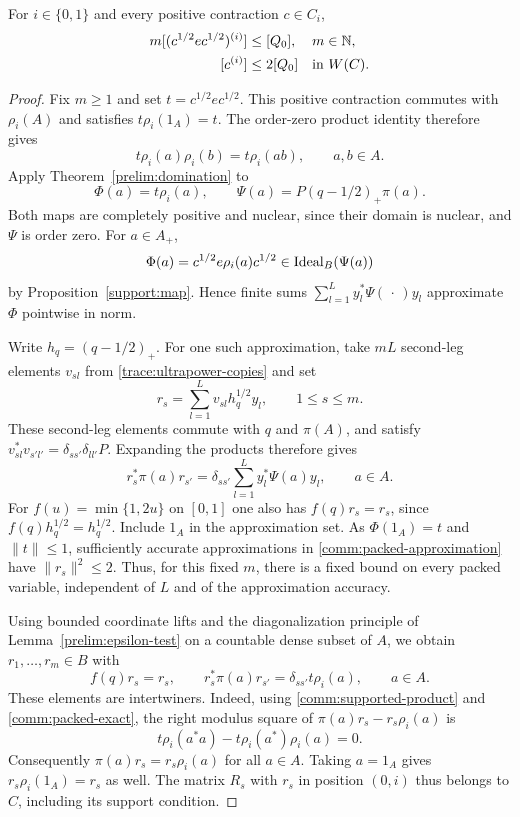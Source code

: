 \begin{proposition}\label{comm:packing}
For $i\in\{0,1\}$ and every positive contraction $c\in C_i$,
\begin{align}
 m[(c^{1/2}ec^{1/2})^{(i)}]&\leq[Q_0],
       &&m\in\mathbb N,\label{comm:small-part}\\
 [c^{(i)}]&\leq2[Q_0]
       &&\text{in }W(C).\label{comm:two-common}
\end{align}
\end{proposition}

\begin{proof}
Fix $m\geq1$ and set $t=c^{1/2}ec^{1/2}$.  This positive
contraction commutes with $\rho_i(A)$ and satisfies
$t\rho_i(1_A)=t$.  The order-zero product identity therefore gives
\begin{equation}\label{comm:supported-product}
 t\rho_i(a)\rho_i(b)=t\rho_i(ab),\qquad a,b\in A.
\end{equation}
Apply Theorem~\ref{prelim:domination} to
\[
 \Phi(a)=t\rho_i(a),\qquad
 \Psi(a)=P(q-1/2)_+\pi(a).
\]
Both maps are completely positive and nuclear, since their domain
is nuclear, and $\Psi$ is order zero.  For $a\in A_+$,
\[
 \Phi(a)=c^{1/2}e\rho_i(a)c^{1/2}
       \in\operatorname{Ideal}_B(\Psi(a))
\]
by Proposition~\ref{support:map}.  Hence finite sums
$\sum_{l=1}^L y_l^*\Psi(\,\cdot\,)y_l$ approximate $\Phi$
pointwise in norm.

Write $h_q=(q-1/2)_+$.  For one such approximation, take $mL$
second-leg elements $v_{sl}$ from \eqref{trace:ultrapower-copies} and set
\[
 r_s=\sum_{l=1}^L v_{sl}h_q^{1/2}y_l,
 \qquad 1\leq s\leq m.
\]
These second-leg elements commute with $q$ and $\pi(A)$, and satisfy
$v_{sl}^*v_{s'l'}=\delta_{ss'}\delta_{ll'}P$.  Expanding the products
therefore gives
\begin{equation}\label{comm:packed-approximation}
 r_s^*\pi(a)r_{s'}=
 \delta_{ss'}\sum_{l=1}^L y_l^*\Psi(a)y_l,
 \qquad a\in A.
\end{equation}
For $f(u)=\min\{1,2u\}$ on $[0,1]$ one also has
$f(q)r_s=r_s$, since $f(q)h_q^{1/2}=h_q^{1/2}$.
Include $1_A$ in the approximation set.  As
$\Phi(1_A)=t$ and $\|t\|\leq1$, sufficiently accurate
approximations in \eqref{comm:packed-approximation} have
$\|r_s\|^2\leq2$.  Thus, for this fixed $m$, there is a fixed
bound on every packed variable, independent of $L$ and of the
approximation accuracy.

Using bounded coordinate lifts and the diagonalization principle of
Lemma~\ref{prelim:epsilon-test} on a countable dense subset of $A$, we
obtain $r_1,\ldots,r_m\in B$ with
\begin{equation}\label{comm:packed-exact}
 f(q)r_s=r_s,\qquad
 r_s^*\pi(a)r_{s'}=\delta_{ss'}t\rho_i(a),
 \qquad a\in A.
\end{equation}
These elements are intertwiners.  Indeed, using
\eqref{comm:supported-product} and
\eqref{comm:packed-exact}, the right modulus square of
$\pi(a)r_s-r_s\rho_i(a)$ is
\[
 t\rho_i(a^*a)-t\rho_i(a^*)\rho_i(a)=0.
\]
Consequently $\pi(a)r_s=r_s\rho_i(a)$ for all $a\in A$.
Taking $a=1_A$ gives $r_s\rho_i(1_A)=r_s$ as well.
The matrix $R_s$ with $r_s$ in position $(0,i)$ thus belongs to
$C$, including its support condition.


\end{proof}
